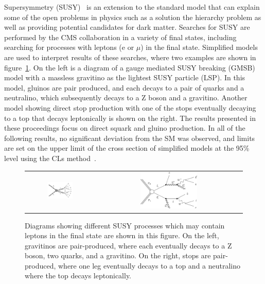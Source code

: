 Supersymmetry (SUSY)~\cite{SUSYPrimer} is an extension to the standard model that can explain some of the open problems in physics such as
a solution the hierarchy problem as well as providing potential candidates for dark matter.
Searches for SUSY are performed by the CMS collaboration in a variety of final states,
including searching for processes with leptons (e or $\mu$) in the final state.
Simplified models~\cite{sms} are used to interpret results of these searches, where two examples are shown in figure~\ref{fig:SMS}.
On the left is a diagram of a gauge mediated SUSY breaking (GMSB) model with a massless gravitino as the lightest SUSY particle (LSP).
In this model, gluinos are pair produced, and each decays to a pair of quarks and a neutralino, which subsequently decays to a Z boson and a gravitino.
Another model showing direct stop production with one of the stops eventually
decaying to a top that decays leptonically is shown on the right.
The results presented in these proceedings focus on direct squark and gluino production.
In all of the following results, no significant deviation from the SM was observed,
and limits are set on the upper limit of the cross section of simplified models at the 95\% level using the CLs method~\cite{Junk:1999kv,Read:2002hq}.

\begin{figure}[!htb]
\begin{center}
\begin{tabular}{cc}
\includegraphics[width=0.4\textwidth]{intro/Feynman_graph_T5ZZgmsb.pdf} &
\includegraphics[width=0.4\textwidth]{intro/T2tt.pdf}
\end{tabular}
\caption{
\label{fig:SMS}
Diagrams showing different SUSY processes which may contain leptons in the final state are shown in this figure.
On the left, gravitinos are pair-produced, where each eventually decays to a Z boson, two quarks, and a gravitino.
On the right, stops are pair-produced, where one leg eventually decays to a top and a neutralino where the top decays leptonically.
}
\end{center}
\end{figure}

